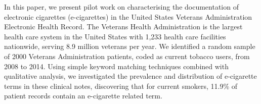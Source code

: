 In this paper, we present pilot work on characterising the documentation of electronic cigarettes (e-cigarettes) in the United States Veterans Administration Electronic Health Record.  The Veterans Health Administration is the largest health care system in the United States with 1,233 health care facilities nationwide, serving 8.9 million veterans per year.   We identified a random sample of 2000 Veterans Administration patients, coded as current tobacco users, from 2008 to 2014.                       Using simple keyword matching techniques combined with qualitative analysis, we investigated the prevalence and distribution of e-cigarette terms in these clinical notes, discovering that for current smokers, 11.9\% of  patient records contain an e-cigarette related term.
